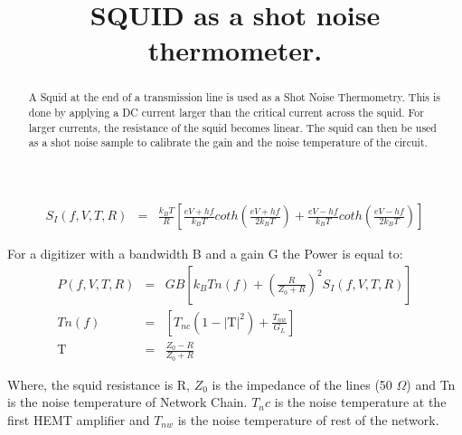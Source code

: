 \documentclass[10pt,a4paper]{article}
\begin{document}
\title{SQUID as a shot noise thermometer.}
\maketitle

\begin{abstract}
A Squid at the end of a transmission line is used as a Shot Noise Thermometry.
This is done by applying a DC current larger than the critical current  across the squid.
For larger currents, the resistance of the squid becomes linear.
The squid can then be used as a shot noise sample to calibrate the gain and the noise temperature 
of the circuit.
\end{abstract}

\begin{eqnarray}
S_I (f, V, T, R) &=&  \frac{k_BT}{R}  
\left[
\frac{eV + hf}{k_BT} 
coth \left( \frac{eV + hf}{2k_BT} \right) +
\frac{eV - hf}{k_BT} 
coth \left( \frac{eV - hf}{2k_BT} \right) 
\right]
\end{eqnarray}

For a digitizer with a bandwidth B and a gain G the Power is equal to:
\begin{eqnarray}
P(f, V, T, R) &=& G B 
\left[ 
k_B Tn(f) + 
\left(
\frac{R}{Z_0 + R}
\right)^2
S_I(f, V, T, R)
\right] \\
%
Tn(f) &=&
\left[ T_{nc} (1- | \mathrm{T} |^2) + \frac{T_{nw}}{G_L}
\right]\\
%
\mathrm{T} &=& \frac{Z_0-R}{Z_0 + R}
\end{eqnarray}

Where, the squid resistance is R, $Z_0$ is the impedance of the lines (50 $\Omega$) and
Tn is the noise temperature of Network Chain.
$T_nc$ is the noise temperature at the first HEMT amplifier and $T_{nw}$ is the noise temperature of rest of the network.
\end{document}

